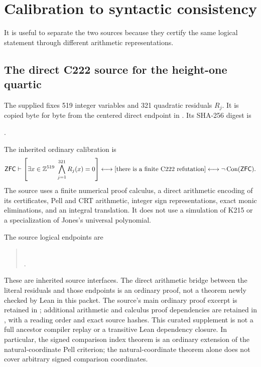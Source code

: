 \section{Calibration to syntactic consistency}\label{sec:calibration}

It is useful to separate the two sources because they certify the same
logical statement through different arithmetic representations.

\subsection{The direct C222 source for the height-one quartic}

The supplied  fixes 519 integer
variables and 321 quadratic residuals $R_j$. It is copied byte for byte
from the centered direct endpoint in \cite{round14}. Its SHA-256 digest is
\begin{center}
\small{}.
\end{center}
The inherited ordinary calibration is
\begin{equation}
 \mathsf{ZFC}\vdash
 \left[\exists x\in\mathbb Z^{519}\;\bigwedge_{j=1}^{321}R_j(x)=0\right]
 \longleftrightarrow
 \left[\text{there is a finite C222 refutation}\right]
 \longleftrightarrow\neg\operatorname{Con}(\mathsf{ZFC}).
 \label{eq:source-calibration}
\end{equation}
The source uses a finite numerical proof calculus, a direct arithmetic
encoding of its certificates, Pell and CRT arithmetic, integer sign
representations, exact monic eliminations, and an integral translation.
It does not use a simulation of K215 or a specialization of Jones's
universal polynomial.

The source logical endpoints are
\begin{quote}
\\
.
\end{quote}
These are inherited source interfaces. The direct arithmetic bridge
between the literal residuals and those endpoints is an ordinary proof,
not a theorem newly checked by Lean in this packet. The source's main
ordinary proof excerpt is retained in ;
additional arithmetic and calculus proof dependencies are retained in
, with a reading order and exact source
hashes. This curated supplement is not a full ancestor compiler replay or
a transitive Lean dependency closure. In particular, the signed comparison
index theorem is an ordinary extension of the natural-coordinate Pell
criterion; the natural-coordinate theorem alone does not cover arbitrary
signed comparison coordinates.

